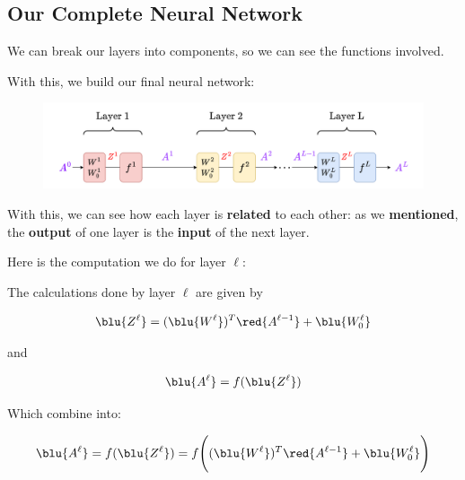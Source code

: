     \subsection{Our Complete Neural Network}
    
        We can break our layers into components, so we can see the functions involved. 
        
        With this, we build our final neural network:
        
        \begin{figure}[H]
            \centering
            \includegraphics[width=140mm,scale=0.4]{images/nn_images/final_neural_network.png}
        \end{figure}
        
        With this, we can see how each layer is \textbf{related} to each other: as we \textbf{mentioned}, the \textbf{output} of one layer is the \textbf{input} of the next layer.
        
        Here is the computation we do for layer $\ell$:\\
        
        \begin{kequation}
            The calculations done by layer $\ell$ are given by
            
            \begin{equation*}
                \blu{Z^\ell} = (\blu{W^\ell})^T \red{A^{\ell-1}} + \blu{W_0^\ell} 
            \end{equation*}
            
            and
            
            \begin{equation*}
                \blu{A^\ell} = f(\blu{Z^\ell})
            \end{equation*}
            
            Which combine into:
            
            \begin{equation*}
                \blu{A^\ell} = f(\blu{Z^\ell}) = 
                f  
                \Bigg( 
                    (\blu{W^\ell})^T \red{A^{\ell-1}} + \blu{W_0^\ell} 
                \Bigg)
            \end{equation*}
        \end{kequation}

